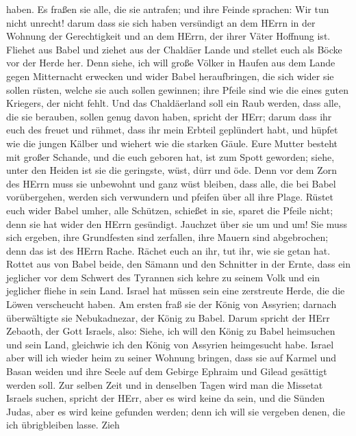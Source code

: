 haben.  Es fraßen sie alle, die sie antrafen; und ihre
Feinde sprachen: Wir tun nicht unrecht! darum dass sie sich haben
versündigt an dem HErrn in der Wohnung der Gerechtigkeit und an dem
HErrn, der ihrer Väter Hoffnung ist.  Fliehet aus Babel und
ziehet aus der Chaldäer Lande und stellet euch als Böcke vor der Herde
her.  Denn siehe, ich will große Völker in Haufen aus dem
Lande gegen Mitternacht erwecken und wider Babel heraufbringen, die sich
wider sie sollen rüsten, welche sie auch sollen gewinnen; ihre Pfeile
sind wie die eines guten Kriegers, der nicht fehlt.  Und
das Chaldäerland soll ein Raub werden, dass alle, die sie berauben,
sollen genug davon haben, spricht der HErr;  darum dass ihr
euch des freuet und rühmet, dass ihr mein Erbteil geplündert habt, und
hüpfet wie die jungen Kälber und wiehert wie die starken Gäule.
 Eure Mutter besteht mit großer Schande, und die euch
geboren hat, ist zum Spott geworden; siehe, unter den Heiden ist sie die
geringste, wüst, dürr und öde.  Denn vor dem Zorn des HErrn
muss sie unbewohnt und ganz wüst bleiben, dass alle, die bei Babel
vorübergehen, werden sich verwundern und pfeifen über all ihre Plage.
 Rüstet euch wider Babel umher, alle Schützen, schießet in
sie, sparet die Pfeile nicht; denn sie hat wider den HErrn gesündigt.
 Jauchzet über sie um und um! Sie muss sich ergeben, ihre
Grundfesten sind zerfallen, ihre Mauern sind abgebrochen; denn das ist
des HErrn Rache. Rächet euch an ihr, tut ihr, wie sie getan hat.
 Rottet aus von Babel beide, den Sämann und den Schnitter
in der Ernte, dass ein jeglicher vor dem Schwert des Tyrannen sich kehre
zu seinem Volk und ein jeglicher fliehe in sein Land. 
Israel hat müssen sein eine zerstreute Herde, die die Löwen verscheucht
haben. Am ersten fraß sie der König von Assyrien; darnach überwältigte
sie Nebukadnezar, der König zu Babel.  Darum spricht der
HErr Zebaoth, der Gott Israels, also: Siehe, ich will den König zu Babel
heimsuchen und sein Land, gleichwie ich den König von Assyrien
heimgesucht habe.  Israel aber will ich wieder heim zu
seiner Wohnung bringen, dass sie auf Karmel und Basan weiden und ihre
Seele auf dem Gebirge Ephraim und Gilead gesättigt werden soll.
 Zur selben Zeit und in denselben Tagen wird man die
Missetat Israels suchen, spricht der HErr, aber es wird keine da sein,
und die Sünden Judas, aber es wird keine gefunden werden; denn ich will
sie vergeben denen, die ich übrigbleiben lasse.  Zieh

